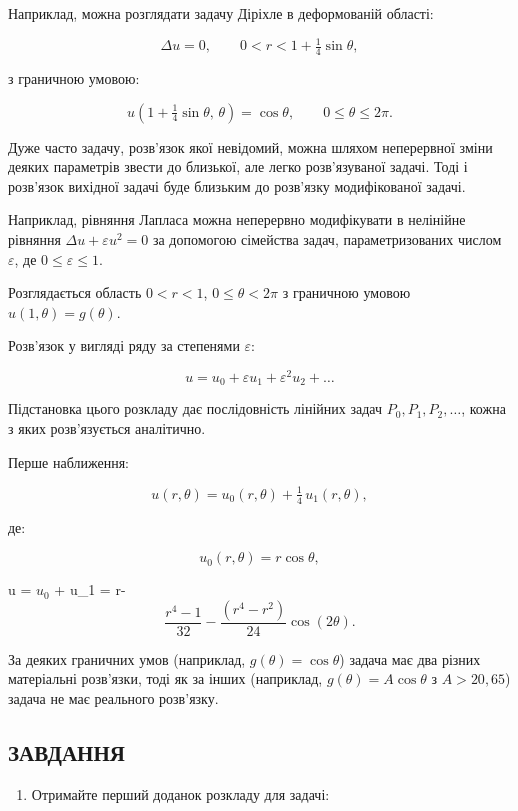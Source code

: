 \documentclass[
  ukrainian,
]{article}
\providecommand{\tightlist}{%
  \setlength{\itemsep}{0pt}\setlength{\parskip}{0pt}}
\begin{document}
Наприклад, можна розглядати задачу Діріхле в деформованій області:

\[
\Delta u = 0, \qquad 0 < r < 1 + \tfrac{1}{4}\sin\theta,
\]

з граничною умовою:

\[
u\!\left(1+\tfrac{1}{4}\sin\theta,\,\theta\right) = \cos\theta, \qquad 0 \le \theta \le 2\pi.
\]

Дуже часто задачу, розв'язок якої невідомий, можна шляхом неперервної
зміни деяких параметрів звести до близької, але легко розв'язуваної
задачі. Тоді і розв'язок вихідної задачі буде близьким до розв'язку
модифікованої задачі.

Наприклад, рівняння Лапласа можна неперервно модифікувати в нелінійне
рівняння \(\Delta u + \varepsilon u^2 = 0\) за допомогою сімейства
задач, параметризованих числом \(\varepsilon\), де
\(0 \le \varepsilon \le 1\).

Розглядається область \(0 < r < 1\), \(0 \le \theta < 2\pi\) з граничною
умовою \(u(1,\theta) = g(\theta)\).

Розв'язок у вигляді ряду за степенями \(\varepsilon\):

\[
u = u_0 + \varepsilon u_1 + \varepsilon^2 u_2 + \dots
\]

Підстановка цього розкладу дає послідовність лінійних задач
\(P_0, P_1, P_2, \ldots\), кожна з яких розв'язується аналітично.

Перше наближення:

\[
u(r,\theta) = u_0(r,\theta) + \tfrac{1}{4}\,u_1(r,\theta),
\]

де:

\[
u_0(r,\theta) = r\cos\theta,
\]

u = \(u_0\) + u\_1 =
r\cos\theta -\[\frac{r^4-1}{32} - \frac{(r^4-r^2)}{24}\cos(2\theta).\]

За деяких граничних умов (наприклад, \(g(\theta) = \cos\theta\)) задача
має два різних матеріальні розв'язки, тоді як за інших (наприклад,
\(g(\theta) = A\cos\theta\) з \(A > 20{,}65\)) задача не має реального
розв'язку.

\subsection{ЗАВДАННЯ}\label{ux437ux430ux432ux434ux430ux43dux43dux44f-25}

\begin{enumerate}
\def\labelenumi{\arabic{enumi}.}
\tightlist
\item
  Отримайте перший доданок розкладу для задачі:
\end{enumerate}
\end{document}
